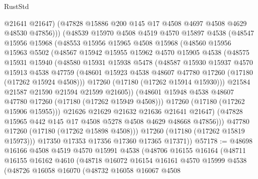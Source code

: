 \begin{lexlean}{RustStd}
\begin{coremodule}
{\begin{coremodule}
{{{{{{{{{{{{{{{{{{{{{{{{{{{{{{{{{{{{{{{{{{{{{{{{{{{{{{{                @21641
                @21647)
              (@47828 @15886 @200 @145 @17 @4508 @4697 @4508 @4629 @48530 @47856)))
          (@48539
            @15970
            @4508
            @4519
            @4570
            @15897
            @4538
            (@48547
              @15956
              @15968
              (@48553
                @15956
                @15965
                @4508
                @15968
                (@48560
                  @15956
                  @15963
                  @5502
                  (@48567
                    @15942
                    @15955
                    @15962
                    @4570
                    @15905
                    @4538
                    (@48575
                      @15931
                      @15940
                      (@48580
                        @15931
                        @15938
                        @5478
                        (@48587
                          @15930
                          @15937
                          @4570
                          @15913
                          @4538
                          @47759
                          (@48601 @15923 @4538 @48607 @47780 @17260 (@17180 (@17262 @15924 @4508)))
                          @17260
                          (@17180 (@17262 @15914 @15930)))
                        @21584
                        @21587
                        @21590
                        @21594
                        @21599
                        @21605))
                    (@48601 @15948 @4538 @48607 @47780 @17260 (@17180 (@17262 @15949 @4508)))
                    @17260
                    (@17180 (@17262 @15906 @15955)))
                  @21626
                  @21629
                  @21632
                  @21636
                  @21641
                  @21647)
                (@47828 @15965 @442 @145 @17 @4508 @5278 @4508 @4629 @48668 @47856)))
            @47780
            @17260
            (@17180 (@17262 @15898 @4508)))
          @17260
          (@17180 (@17262 @15819 @15973)))
        @17350
        @17353
        @17356
        @17360
        @17365
        @17371))
@57178 := @48698
    @16166
    @4508
    @4519
    @4570
    @15991
    @4538
    (@48706
      @16155
      @16164
      (@48711
        @16155
        @16162
        @4610
        (@48718
          @16072
          @16154
          @16161
          @4570
          @15999
          @4538
          (@48726
            @16058
            @16070
            (@48732
              @16058
              @16067
              @4508
}}}}}}}}}}}}}}}}}}}}}}}}}}}}}}}}}}}}}}}}}}}}}}}}}}}}}}}
\end{coremodule}}
\end{coremodule}
\end{lexlean}
